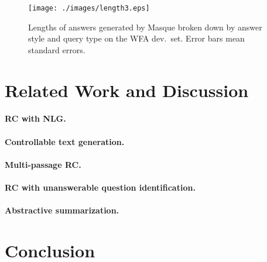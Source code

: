 \documentclass[11pt,a4paper]{article}
\theoremstyle{mydef}
\theoremstyle{myprob}
\begin{document}
\begin{figure}[t!]
\centering
\texttt{[image: ./images/length3.eps]}
\caption{Lengths of answers generated by Masque broken down by answer style and query type on the WFA dev.\ set. Error bars mean standard errors.}
\label{fig:length}
\end{figure}

\section{Related Work and Discussion}

\paragraph{RC with NLG.}

\paragraph{Controllable text generation.}

\paragraph{Multi-passage RC.}

\paragraph{RC with unanswerable question identification.}

\paragraph{Abstractive summarization.}

\section{Conclusion}



\end{document}
